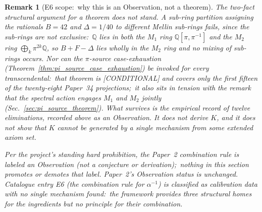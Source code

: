 \documentclass[11pt]{article}
\newtheorem{remark}{Remark}
\begin{document}
\begin{remark}[E6 scope:\ why this is an Observation, not a theorem]
\label{rem:e6_scope}
The two-fact structural argument for a theorem does not stand.  A sub-ring
partition assigning the rationals $B = 42$ and $\Delta = 1/40$ to
different Mellin sub-rings fails, since the sub-rings are not
exclusive:\  $\mathbb{Q}$ lies in both
the $M_1$ ring $\mathbb{Q}[\pi, \pi^{-1}]$ and the $M_2$ ring
$\bigoplus_k \pi^{2k}\mathbb{Q}$, so $B + F - \Delta$ lies wholly in
the $M_2$ ring and no mixing of sub-rings occurs.  Nor can the
$\pi$-source case-exhaustion
(Theorem~\ref{thm:pi_source_case_exhaustion}) be invoked for \emph{every}
transcendental:\ that theorem is [CONDITIONAL] and covers only
the first fifteen of the twenty-eight Paper~34 projections;\ it also
sits in tension with the remark that the spectral action engages $M_1$
and $M_2$ jointly (Sec.~\ref{sec:pi_source_theorem}).  What survives is
the empirical record of twelve eliminations, recorded above as an
Observation.  It does not derive $K$, and it does not show that $K$
cannot be generated by a single mechanism from some extended axiom set.

Per the project's standing hard prohibition, the Paper~2 combination
rule is labeled an \emph{Observation} (not a conjecture or
derivation);\ nothing in this section promotes or demotes that label.
Paper~2's Observation status is unchanged.  Catalogue entry E6 (the
combination rule for $\alpha^{-1}$) is classified as calibration data
with no single mechanism found:\ the framework provides three
structural homes for the ingredients but no principle for their
combination.
\end{remark}

\end{document}
